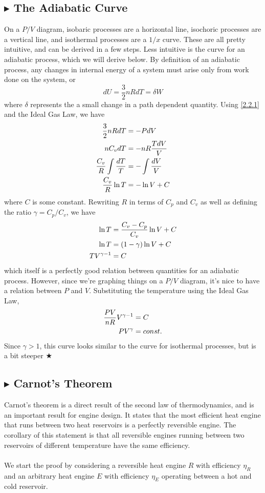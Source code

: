 %
%
\subsection{\color{Orchid} $\blacktriangleright$ \color{black} The Adiabatic Curve} \label{2.2.3}
On a $P/V$ diagram, isobaric processes are a horizontal line, isochoric processes are a vertical line, and isothermal processes are a $1/x$ curve. These are all pretty intuitive, and can be derived in a few steps. Less intuitive is the curve for an adiabatic process, which we will derive below. By definition of an adiabatic process, any changes in internal energy of a system must arise only from work done on the system, or
\begin{equation}
    dU = \frac32nRdT = \delta W
\end{equation}
\noindent where $\delta$ represents the a small change in a path dependent quantity. Using \ref{2.2.1} and the Ideal Gas Law, we have
\begin{align}
    \frac32nRdT &= -PdV \nonumber \\
    nC_vdT &= -nR\frac{TdV}{V} \nonumber \\
    \frac{C_v}{R}\int\frac{dT}{T} &= -\int\frac{dV}{V} \nonumber \\
    \frac{C_v}{R}\ln T &= -\ln V + C
\end{align}
\noindent where $C$ is some constant. Rewriting $R$ in terms of $C_p$ and $C_v$ as well as defining the ratio $\gamma = C_p/C_v$, we have
\begin{align}
    \ln T &= \frac{C_v-C_p}{C_v}\ln V + C \nonumber \\
    \ln T &= (1-\gamma)\ln V +C \nonumber \\
    TV^{\gamma-1} &= C
\end{align}
\noindent which itself is a perfectly good relation between quantities for an adiabatic process. However, since we're graphing things on a $P/V$ diagram, it's nice to have a relation between $P$ and $V$. Substituting the temperature using the Ideal Gas Law,
\begin{align}
    \frac{PV}{nR}V^{\gamma-1} &= C \nonumber \\
    PV^\gamma &= const.
\end{align}
\noindent Since $\gamma>1$, this curve looks similar to the curve for isothermal processes, but is a bit steeper $\bigstar$

%
%
\subsection{\color{Orchid} $\blacktriangleright$ \color{black} Carnot's Theorem} \label{2.2.4}
Carnot's theorem is a direct result of the second law of thermodynamics, and is an important result for engine design. It states that the most efficient heat engine that runs between two heat reservoirs is a perfectly reversible engine. The corollary of this statement is that all reversible engines running between two reservoirs of different temperature have the same efficiency. \\
\\
\noindent We start the proof by considering a reversible heat engine $R$ with efficiency $\eta_R$ and an arbitrary heat engine $E$ with efficiency $\eta_E$ operating between a hot and cold reservoir.

